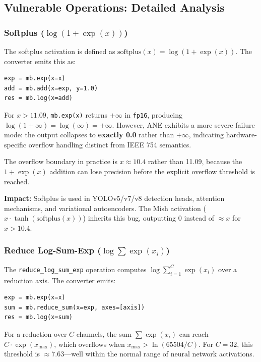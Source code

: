 \documentclass[10pt,twocolumn]{article}
\newcommand{\fp}{\texttt{fp16}}
\newcommand{\ane}{ANE}
\begin{document}
\subsection{Vulnerable Operations: Detailed Analysis}

\subsubsection{\texorpdfstring{Softplus ($\log(1 + \exp(x))$)}{Softplus (log(1 + exp(x)))}}
\label{sec:softplus}

The softplus activation is defined as
$\text{softplus}(x) = \log(1 + \exp(x))$.  The converter emits
this as:
\begin{lstlisting}
exp = mb.exp(x=x)
add = mb.add(x=exp, y=1.0)
res = mb.log(x=add)
\end{lstlisting}

For $x > 11.09$, \texttt{mb.exp(x)} returns $+\infty$ in \fp{},
producing $\log(1 + \infty) = \log(\infty) = +\infty$.  However,
\ane{} exhibits a more severe failure mode: the output collapses to
\textbf{exactly 0.0} rather than $+\infty$, indicating
hardware-specific overflow handling distinct from IEEE 754
semantics.

The overflow boundary in practice is $x \approx 10.4$ rather than
11.09, because the $1 + \exp(x)$ addition can lose precision
before the explicit overflow threshold is reached.

\textbf{Impact:} Softplus is used in YOLOv5/v7/v8 detection heads,
attention mechanisms, and variational autoencoders.  The Mish
activation ($x \cdot \tanh(\text{softplus}(x))$) inherits this bug,
outputting 0 instead of $\approx x$ for $x > 10.4$.

\subsubsection{\texorpdfstring{Reduce Log-Sum-Exp ($\log \sum \exp(x_i)$)}{Reduce Log-Sum-Exp}}
\label{sec:logsumexp}

The \texttt{reduce\_log\_sum\_exp} operation computes $\log \sum_{i=1}^{C}
\exp(x_i)$ over a reduction axis.  The converter emits:
\begin{lstlisting}
exp = mb.exp(x=x)
sum = mb.reduce_sum(x=exp, axes=[axis])
res = mb.log(x=sum)
\end{lstlisting}

For a reduction over $C$ channels, the sum $\sum \exp(x_i)$ can
reach $C \cdot \exp(x_{\max})$, which overflows when
$x_{\max} > \ln(65504/C)$.  For $C = 32$, this threshold is
$\approx 7.63$---well within the normal range of neural network
activations.
\end{document}

